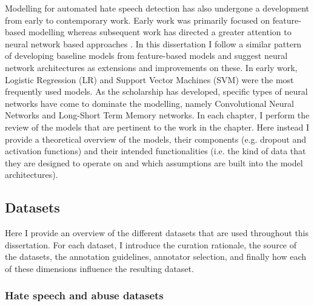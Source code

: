 Modelling for automated hate speech detection has also undergone a development from early to contemporary work. Early work was primarily focused on feature-based modelling \citep[e.g.][]{Waseem-Hovy:2016,Waseem:2016,Davidson:2017} whereas subsequent work has directed a greater attention to neural network based approaches \citep[e.g.][]{Kolhatkar:2021,Waseem:2018,Gamback:2017,Badjatiya:2017}. In this dissertation I follow a similar pattern of developing baseline models from feature-based models and suggest neural network architectures as extensions and improvements on these. In early work, Logistic Regression (LR) and Support Vector Machines (SVM) were the most frequently used models. As the scholarship has developed, specific types of neural networks have come to dominate the modelling, namely Convolutional Neural Networks and Long-Short Term Memory networks. In each chapter, I perform the review of the models that are pertinent to the work in the chapter. Here instead I provide a theoretical overview of the models, their components (e.g. dropout and activation functions) and their intended functionalities (i.e. the kind of data that they are designed to operate on and which assumptions are built into the model architectures).

\subsection{Datasets}

Here I provide an overview of the different datasets that are used throughout this dissertation. For each dataset, I introduce the curation rationale, the source of the datasets, the annotation guidelines, annotator selection, and finally how each of these dimensions influence the resulting dataset.


\subsubsection{Hate speech and abuse datasets}

